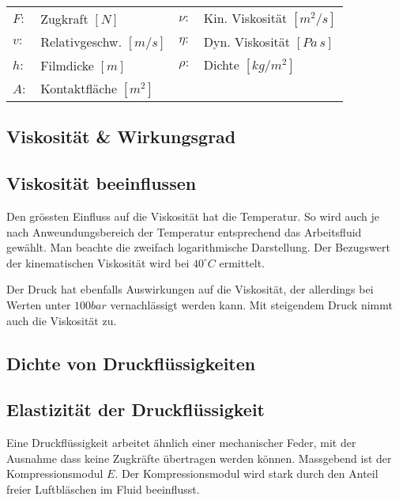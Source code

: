 \begin{tabular}{llll}
$F:$ & Zugkraft $[N]$ & $\nu:$ & Kin. Viskosität $[m^2/s]$ \\
$v:$ & Relativgeschw. $[m/s]$ & $\eta:$ & Dyn. Viskosität $[Pa\,s]$ \\
$h:$ & Filmdicke $[m]$ & $\rho:$ & Dichte $[kg/m^2]$\\
$A:$ & Kontaktfläche $[m^2]$
\end{tabular}


\subsection{Viskosität \& Wirkungsgrad}
\vfill


\subsection{Viskosität beeinflussen}
Den grössten Einfluss auf die Viskosität hat die Temperatur. So wird auch je nach Anweundungsbereich der Temperatur entsprechend das Arbeitsfluid gewählt.
Man beachte die zweifach logarithmische Darstellung. Der Bezugswert der kinematischen Viskosität wird bei $40^\circ C$ ermittelt.

Der Druck hat ebenfalls Auswirkungen auf die Viskosität, der allerdings bei Werten unter $100 bar$ vernachlässigt werden kann. Mit steigendem Druck nimmt auch die Viskosität zu.
\vfill

\subsection{Dichte von Druckflüssigkeiten}



\vfill
\columnbreak
\subsection{Elastizität der Druckflüssigkeit}
Eine Druckflüssigkeit arbeitet ähnlich einer mechanischer Feder, mit der Ausnahme dass keine Zugkräfte übertragen werden können. Massgebend ist der Kompressionsmodul $E$. Der Kompressionsmodul wird stark durch den Anteil freier Luftbläschen im Fluid beeinflusst.

